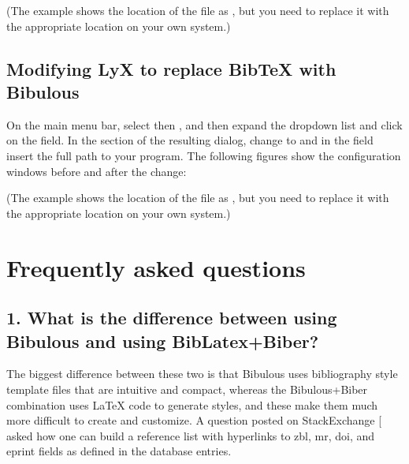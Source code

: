 \documentclass[letterpaper,10pt,english]{sphinxmanual}
\begin{document}
\noindent{}

\noindent{}

(The example shows the location of the  file as , but you need to replace it with the appropriate location on your own system.)


\section{Modifying LyX to replace BibTeX with Bibulous}
\label{\detokenize{getting_started:modifying-lyx-to-replace-bibtex-with-bibulous}}
On the main menu bar, select  then , and then expand the  dropdown list and click on the  field. In the  section of the resulting dialog, change  to  and in the  field insert the full path to your  program. The following figures show the configuration windows before and after the change:

\noindent{}

\noindent{}

(The example shows the location of the  file as , but you need to replace it with the appropriate location on your own system.)


\chapter{Frequently asked questions}
\label{\detokenize{faq:frequently-asked-questions}}\label{\detokenize{faq::doc}}

\section{1. What is the difference between using Bibulous and using BibLatex+Biber?}
\label{\detokenize{faq:what-is-the-difference-between-using-bibulous-and-using-biblatex-biber}}
The biggest difference between these two is that Bibulous uses bibliography style template files that are intuitive and compact, whereas the Bibulous+Biber combination uses LaTeX code to generate styles, and these make them much more difficult to create and customize. A question posted on StackExchange {[}\sphinxurl{http://tex.stackexchange.com/questions/151628/bibtex-fields-for-doi-mr-zbl-and-arxiv/163628\#163628}{]} asked how one can build a reference list with hyperlinks to zbl, mr, doi, and eprint fields as defined in the database entries.
\end{document}
